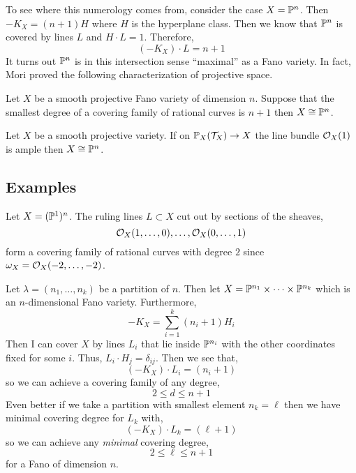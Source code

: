 \documentclass[12pt]{article}
\begin{document}
\begin{example}
To see where this numerology comes from, consider the case $X = \P^n$. Then $-K_X = (n+1)H$ where $H$ is the hyperplane class. Then we know that $\P^n$ is covered by lines $L$ and $H \cdot L = 1$. Therefore,
\[ (-K_X) \cdot L = n + 1 \]
It turns out $\P^n$ is in this intersection sense ``maximal'' as a Fano variety. In fact, Mori proved the following characterization of projective space.
\end{example}

\begin{thm}[Mori]
Let $X$ be a smooth projective Fano variety of dimension $n$. Suppose that the smallest degree of a covering family of rational curves is $n + 1$ then $X \cong \P^n$. 
\end{thm}

\begin{cor}
Let $X$ be a smooth projective variety. If on $\P_X(\T_X) \to X$ the line bundle $\struct{X}(1)$ is ample then $X \cong \P^n$. 
\end{cor}

\subsection{Examples}

\begin{example}
Let $X = (\P^1)^n$. The ruling lines $L \subset X$ cut out by sections of the sheaves,
\[ \struct{X}(1,\dots, 0), \dots, \struct{X}(0, \dots, 1) \]
form a covering family of rational curves with degree $2$ since $\omega_X = \struct{X}(-2, \dots, -2)$. 
\end{example}

\begin{example}
Let $\lambda = (n_1, \dots, n_k)$ be a partition of $n$. Then let $X = \P^{n_1} \times \cdots \times \P^{n_k}$ which is an $n$-dimensional Fano variety. Furthermore, 
\[ -K_X = \sum_{i = 1}^k (n_i + 1) H_i \]
Then I can cover $X$ by lines $L_i$ that lie inside $\P^{n_i}$ with the other coordinates fixed for some $i$. Thus, $L_i \cdot H_j = \delta_{ij}$. Then we see that,
\[ (-K_X) \cdot L_i = (n_i + 1) \]
so we can achieve a covering family of any degree,
\[ 2 \le d \le n + 1 \]
Even better if we take a partition with smallest element $n_k = \ell$ then we have minimal covering degree for $L_k$ with,
\[ (-K_X) \cdot L_k = (\ell + 1) \]
so we can achieve any \textit{minimal} covering degree,
\[ 2 \le \ell \le n + 1 \]
for a Fano of dimension $n$.
\end{example}
\end{document}
